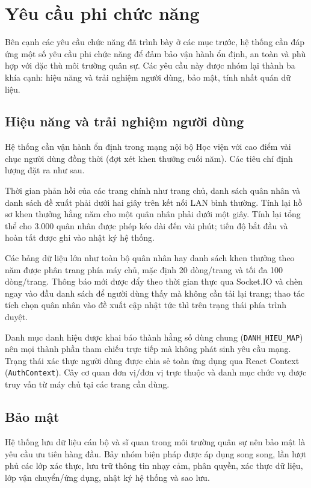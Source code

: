 \documentclass[../DoAn.tex]{subfiles}
\begin{document}
\section{Yêu cầu phi chức năng}
\label{section:2.4}

Bên cạnh các yêu cầu chức năng đã trình bày ở các mục trước, hệ thống cần đáp ứng một số yêu cầu phi chức năng để đảm bảo vận hành ổn định, an toàn và phù hợp với đặc thù môi trường quân sự. Các yêu cầu này được nhóm lại thành ba khía cạnh: hiệu năng và trải nghiệm người dùng, bảo mật, tính nhất quán dữ liệu.

\subsection{Hiệu năng và trải nghiệm người dùng}
\label{subsection:2.4.1}

Hệ thống cần vận hành ổn định trong mạng nội bộ Học viện với cao điểm vài chục người dùng đồng thời (đợt xét khen thưởng cuối năm). Các tiêu chí định lượng đặt ra như sau.

Thời gian phản hồi của các trang chính như trang chủ, danh sách quân nhân và danh sách đề xuất phải dưới hai giây trên kết nối LAN bình thường. Tính lại hồ sơ khen thưởng hằng năm cho một quân nhân phải dưới một giây. Tính lại tổng thể cho 3.000 quân nhân được phép kéo dài đến vài phút; tiến độ bắt đầu và hoàn tất được ghi vào nhật ký hệ thống.

Các bảng dữ liệu lớn như toàn bộ quân nhân hay danh sách khen thưởng theo năm được phân trang phía máy chủ, mặc định 20 dòng/trang và tối đa 100 dòng/trang. Thông báo mới được đẩy theo thời gian thực qua Socket.IO và chèn ngay vào đầu danh sách để người dùng thấy mà không cần tải lại trang; thao tác tích chọn quân nhân vào đề xuất cập nhật tức thì trên trạng thái phía trình duyệt.

Danh mục danh hiệu được khai báo thành hằng số dùng chung (\texttt{DANH\_HIEU\_MAP}) nên mọi thành phần tham chiếu trực tiếp mà không phát sinh yêu cầu mạng. Trạng thái xác thực người dùng được chia sẻ toàn ứng dụng qua React Context (\texttt{AuthContext}). Cây cơ quan đơn vị/đơn vị trực thuộc và danh mục chức vụ được truy vấn từ máy chủ tại các trang cần dùng.

\subsection{Bảo mật}
\label{subsection:2.4.2}

Hệ thống lưu dữ liệu cán bộ và sĩ quan trong môi trường quân sự nên bảo mật là yêu cầu ưu tiên hàng đầu. Bảy nhóm biện pháp được áp dụng song song, lần lượt phủ các lớp xác thực, lưu trữ thông tin nhạy cảm, phân quyền, xác thực dữ liệu, lớp vận chuyển/ứng dụng, nhật ký hệ thống và sao lưu.
\end{document}
